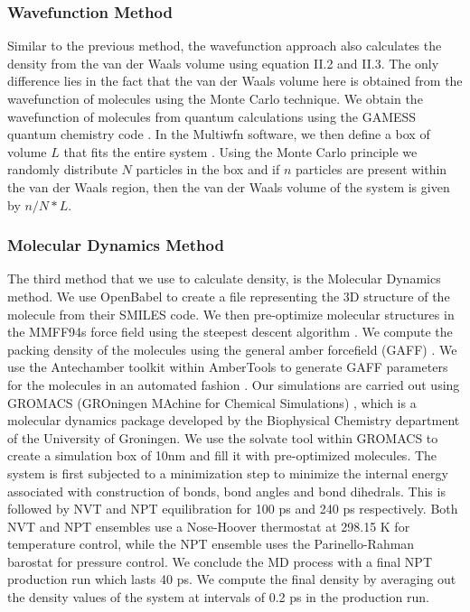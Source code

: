 \subsubsection{Wavefunction Method}
\label{subsec:wavefunction}

Similar to the previous method, the wavefunction approach also calculates the density from the van der Waals volume using equation II.2 and II.3. The only difference lies in the fact that the van der Waals volume here is obtained from the wavefunction of molecules using the Monte Carlo technique. We obtain the wavefunction of molecules from quantum calculations using the GAMESS quantum chemistry code \cite{Micheal1993}. In the Multiwfn software, we then define a box of volume $L$ that fits the entire system \cite{Lu2012}. Using the Monte Carlo principle we randomly distribute $N$ particles in the box and if $n$ particles are present within the van der Waals region, then the van der Waals volume of the system is given by $n/N*L$. 

\subsubsection{Molecular Dynamics Method}
\label{subsec:mdmethod}

The third method that we use to calculate density, is the Molecular Dynamics method. We use OpenBabel to create a file representing the 3D structure of the molecule from their SMILES code. We then pre-optimize molecular structures in the MMFF94s force field using the steepest descent algorithm \cite{OBoyle2011}. We compute the packing density of the molecules using the general amber forcefield (GAFF) \cite{Wang2004}. We use the Antechamber toolkit within AmberTools to generate GAFF parameters for the molecules in an automated fashion \cite{Wang2006a}. Our simulations are carried out using GROMACS (GROningen MAchine for Chemical Simulations) \cite{Beredsen1995}, which is a molecular dynamics package developed by the Biophysical Chemistry department of the University of Groningen. We use the solvate tool within GROMACS to create a simulation box of 10nm and fill it with pre-optimized molecules. The system is first subjected to a minimization step to minimize the internal energy associated with construction of bonds, bond angles and bond dihedrals. This is followed by NVT and NPT equilibration for 100 ps and 240 ps respectively. Both NVT and NPT ensembles use a Nose-Hoover thermostat at 298.15 K for temperature control, while the NPT ensemble uses the Parinello-Rahman barostat for pressure control. We conclude the MD process with a final NPT production run which lasts 40 ps. We compute the final density by averaging out the density values of the system at intervals of 0.2 ps in the production run. 

